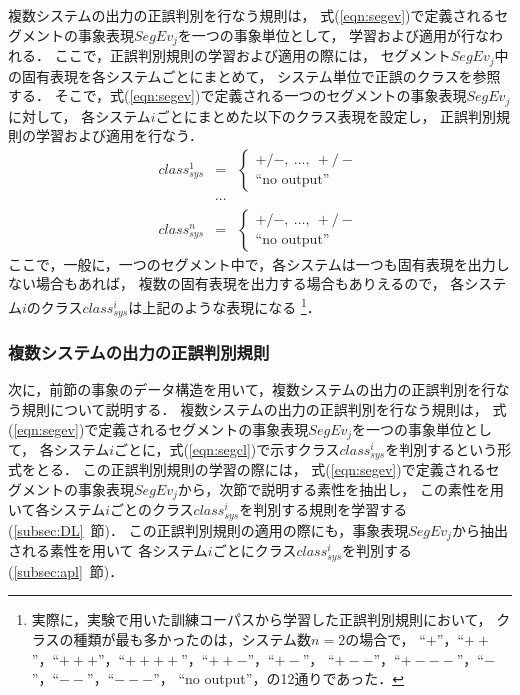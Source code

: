 複数システムの出力の正誤判別を行なう規則は，
式(\ref{eqn:segev})で定義されるセグメントの事象表現$SegEv_j$を一つの事象単位として，
学習および適用が行なわれる．
ここで，正誤判別規則の学習および適用の際には，
セグメント$SegEv_j$中の固有表現を各システムごとにまとめて，
システム単位で正誤のクラスを参照する．
そこで，式(\ref{eqn:segev})で定義される一つのセグメントの事象表現$SegEv_j$に対して，
各システム$i$ごとにまとめた以下のクラス表現を設定し，
正誤判別規則の学習および適用を行なう．
\begin{eqnarray}
class_{sys}^1  & = & 
	\left\{\begin{array}{l}
	  +/-,\ \ldots,\ +/- \\
	 \mbox{``no output''} 
	\end{array}\right. \nonumber \\
         & \cdots & \label{eqn:segcl} \\
class_{sys}^n  & = & 
	\left\{\begin{array}{l}
	  +/-,\ \ldots,\ +/- \\
	 \mbox{``no output''} 
	\end{array}\right. \nonumber 
\end{eqnarray}
ここで，一般に，一つのセグメント中で，各システムは一つも固有表現を出力しない場合もあれば，
複数の固有表現を出力する場合もありえるので，
各システム$i$のクラス$class_{sys}^i$は上記のような表現になる
\footnote{
  実際に，実験で用いた訓練コーパスから学習した正誤判別規則において，
  クラスの種類が最も多かったのは，システム数$n\!=\!2$の場合で，
  ``$+$''，``$++$''，``$+++$''，``$++++$''，``$++-$''，``$+-$''，
  ``$+--$''，``$+---$''，``$-$''，``$--$''，``$---$''，
  ``no output''，の12通りであった．
}．

\subsubsection{複数システムの出力の正誤判別規則}

次に，前節の事象のデータ構造を用いて，複数システムの出力の正誤判別を行なう規則について説明する．
複数システムの出力の正誤判別を行なう規則は，
式(\ref{eqn:segev})で定義されるセグメントの事象表現$SegEv_j$を一つの事象単位として，
各システム$i$ごとに，式(\ref{eqn:segcl})で示すクラス$class_{sys}^i$を判別するという形式をとる．
この正誤判別規則の学習の際には，
式(\ref{eqn:segev})で定義されるセグメントの事象表現$SegEv_j$から，次節で説明する素性を抽出し，
この素性を用いて各システム$i$ごとのクラス$class_{sys}^i$を判別する規則を学習する
(\ref{subsec:DL}~節)．
この正誤判別規則の適用の際にも，事象表現$SegEv_j$から抽出される素性を用いて
各システム$i$ごとにクラス$class_{sys}^i$を判別する(\ref{subsec:apl}~節)．

